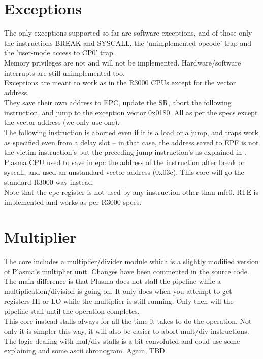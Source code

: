     
\section{Exceptions}
\label{exceptions}

    The only exceptions supported so far are software exceptions, and of those 
    only the instructions BREAK and SYSCALL, the 'unimplemented opcode' trap and
    the 'user-mode access to CP0' trap.\\
    Memory privileges are not and will not be implemented. Hardware/software 
    interrupts are still unimplemented too.\\
    
    Exceptions are meant to work as in the R3000 CPUs except for the vector 
    address.\\
    They save their own address to EPC, update the SR, abort the following 
    instruction, and jump to the exception vector 0x0180. All as per the specs 
    except the vector address (we only use one).\\
        
    The following instruction is aborted even if it is a load or a jump, and 
    traps work as specified even from a delay slot -- in that case, the address
    saved to EPF is not the victim instruction's but the preceding jump 
    instruction's as explained in \cite[p.~64]{see_mips_run}.\\
    
    Plasma CPU used to save in epc the address of the instruction after break or 
    syscall, and used an unstandard vector address (0x03c). This core will go 
    the standard R3000 way instead.\\
    
    Note that the epc register is not used by any instruction other than mfc0.
    RTE is implemented and works as per R3000 specs.\\


\section{Multiplier}
\label{multiplier}

    The core includes a multiplier/divider module which is a slightly modified 
    version of Plasma's multiplier unit. Changes have been commented in the 
    source code.\\
    
    The main difference is that Plasma does not stall the pipeline while a 
    multiplication/division is going on. It only does when you attempt to get 
    registers HI or LO while the multiplier is still running. Only then will
    the pipeline stall until the operation completes.\\
    This core instead stalls always for all the time it takes to do the 
    operation. Not only it is simpler this way, it will also be easier to 
    abort mult/div instructions.\\
    
    The logic dealing with mul/div stalls is a bit convoluted and coud use some
    explaining and some ascii chronogram. Again, TBD.\\